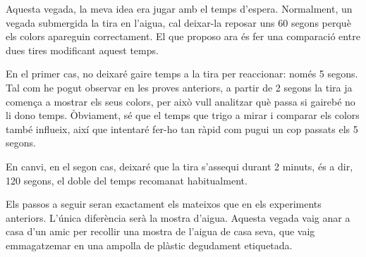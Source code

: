 Aquesta vegada, la meva idea era jugar amb el temps d’espera. Normalment, un vegada submergida la tira en l’aigua, cal deixar-la reposar uns 60 segons perquè els colors apareguin correctament. El que proposo ara és fer una comparació entre dues tires modificant aquest temps.

En el primer cas, no deixaré gaire temps a la tira per reaccionar: només 5 segons. Tal com he pogut observar en les proves anteriors, a partir de 2 segons la tira ja comença a mostrar els seus colors, per això vull analitzar què passa si gairebé no li dono temps. Òbviament, sé que el temps que trigo a mirar i comparar els colors també influeix, així que intentaré fer-ho tan ràpid com pugui un cop passats els 5 segons.

En canvi, en el segon cas, deixaré que la tira s’assequi durant 2 minuts, és a dir, 120 segons, el doble del temps recomanat habitualment.

Els passos a seguir seran exactament els mateixos que en els experiments anteriors. L’única diferència serà la mostra d’aigua. Aquesta vegada vaig anar a casa d’un amic per recollir una mostra de l’aigua de casa seva, que vaig emmagatzemar en una ampolla de plàstic degudament etiquetada.

